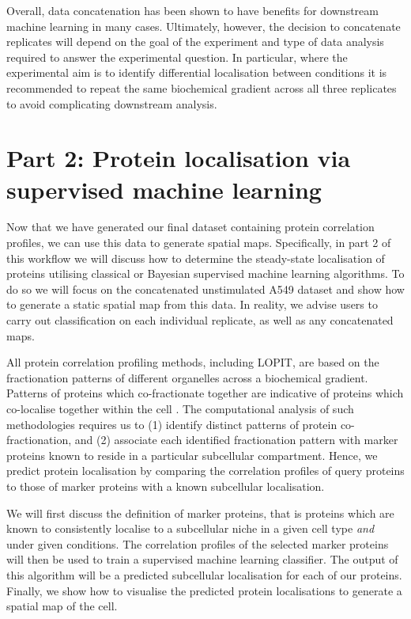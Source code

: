 \documentclass[9pt,a4paper,]{extarticle}
\begin{document}
Overall, data concatenation has been shown to have benefits for downstream machine
learning in many cases. Ultimately, however, the decision to concatenate replicates
will depend on the goal of the experiment and type of data analysis required to
answer the experimental question. In particular, where the experimental aim is to
identify differential localisation between conditions it is recommended to repeat
the same biochemical gradient across all three replicates to avoid complicating
downstream analysis.

\section{Part 2: Protein localisation via supervised machine learning}\label{part-2-protein-localisation-via-supervised-machine-learning}

Now that we have generated our final dataset containing protein correlation
profiles, we can use this data to generate spatial maps. Specifically,
in part 2 of this workflow we will discuss how to determine the steady-state
localisation of proteins utilising classical or Bayesian supervised machine
learning algorithms. To do so we will focus on the concatenated unstimulated A549
dataset and show how to generate a static spatial map from this data. In reality,
we advise users to carry out classification on each individual replicate, as well
as any concatenated maps.

All protein correlation profiling methods, including LOPIT, are based on the
fractionation patterns of different organelles across a biochemical gradient.
Patterns of proteins which co-fractionate together are indicative of proteins
which co-localise together within the cell \citep{DeDuve1981}. The computational
analysis of such methodologies requires us to (1) identify distinct patterns of
protein co-fractionation, and (2) associate each identified fractionation pattern
with marker proteins known to reside in a particular subcellular compartment.
Hence, we predict protein localisation by comparing the correlation
profiles of query proteins to those of marker proteins with a known subcellular
localisation.

We will first discuss the definition of marker proteins, that is proteins which
are known to consistently localise to a subcellular niche in a given cell type
\emph{and} under given conditions. The correlation profiles of the selected
marker proteins will then be used to train a supervised machine learning
classifier. The output of this algorithm will be a predicted subcellular
localisation for each of our proteins. Finally, we show how to visualise the
predicted protein localisations to generate a spatial map of the cell.
\end{document}
